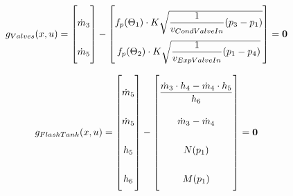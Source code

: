 \begin{equation} \label{eq:consump_x}\renewcommand{\arraystretch}{2.5}
	g_{Valves}(x,u) =  \begin{bmatrix}
		\dot{m}_{3}			\\ %

		\dot{m}_{5}			\\ %
	\end{bmatrix}
	-
	\begin{bmatrix}
		f_p(\Theta_1) \cdot K  \sqrt{\dfrac{1}{v_{CondValveIn}} (p_{3} - p_{1})}\\		%
		f_p(\Theta_2) \cdot K  \sqrt{\dfrac{1}{v_{ExpValveIn}} (p_{1} - p_{4})}\\			%
	\end{bmatrix}
	=\textbf{0}
\end{equation}

\begin{equation} \label{eq:consump_x}\renewcommand{\arraystretch}{2.5}
	g_{FlashTank}(x,u) =  \begin{bmatrix}
		\dot{m}_{5}			\\
		\dot{m}_{5}				\\
		h_{5}  \\
		h_{6} \\
	\end{bmatrix}
	-
	\begin{bmatrix}
		\dfrac{\dot{m}_{3} \cdot h_4 - \dot{m}_{4} \cdot h_5}{h_6}					\\
		\dot{m}_{3} - \dot{m}_{4}					\\
		N(p_1)\\
		M(p_1)\\
	\end{bmatrix}
	=\textbf{0}
\end{equation}



